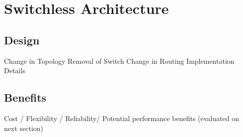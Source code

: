 \section{Switchless Architecture}
\label{sec:arch}
\subsection{Design}
Change in Topology
Removal of Switch
Change in Routing
Implementation Details
\subsection{Benefits}
Cost / Flexibility / Reliability/ Potential performance benefits (evaluated on next section)
